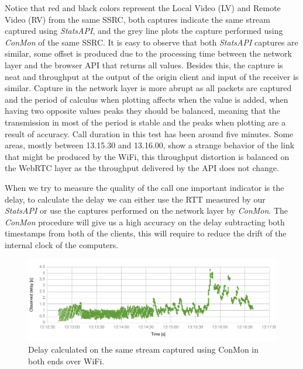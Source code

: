 Notice that red and black colors represent the Local Video (LV) and Remote Video (RV) from the same SSRC, both captures indicate the same stream captured using {\it StatsAPI}, and the grey line plots the capture performed using {\it ConMon} of the same SSRC. It is easy to observe that both {\it StatsAPI} captures are similar, some offset is produced due to the processing time between the network layer and the browser API that returns all values. Besides this, the capture is neat and throughput at the output of the origin client and input of the receiver is similar. Capture in the network layer is more abrupt as all packets are captured and the period of calculus when plotting affects when the value is added, when having two opposite values peaks they should be balanced, meaning that the transmission in most of the period is stable and the peaks when plotting are a result of accuracy. Call duration in this test has been around five minutes. Some areas, mostly between 13.15.30 and 13.16.00, show a strange behavior of the link that might be produced by the WiFi, this throughput distortion is balanced on the WebRTC layer as the throughput delivered by the API does not change.

When we try to measure the quality of the call one important indicator is the delay, to calculate the delay we can either use the RTT measured by our {\it StatsAPI} or use the captures performed on the network layer by {\it ConMon}. The {\it ConMon} procedure will give us a high accuracy on the delay subtracting both timestamps from both of the clients, this will require to reduce the drift of the internal clock of the computers.

 \begin{figure}[h]
  \centering
    \includegraphics[width=1\textwidth]{./figures/delay_116_646227.pdf}
      \caption[Delay calculated on the same stream captured using ConMon in both ends over WiFi]{Delay calculated on the same stream captured using ConMon in both ends over WiFi.}
	\label{fig:delay_116_646227}
\end{figure}

